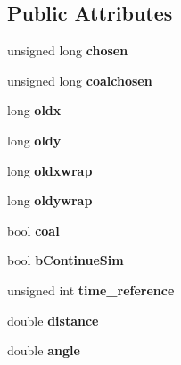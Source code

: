 \subsection*{Public Attributes}
\begin{DoxyCompactItemize}
\item 
unsigned long {\bfseries chosen}\hypertarget{struct_step_a03a0984250a050752ff20129ff457510}{}\label{struct_step_a03a0984250a050752ff20129ff457510}

\item 
unsigned long {\bfseries coalchosen}\hypertarget{struct_step_a5824c6f227fbe3aa249f6067bae0aab2}{}\label{struct_step_a5824c6f227fbe3aa249f6067bae0aab2}

\item 
long {\bfseries oldx}\hypertarget{struct_step_a79f782f87fe4df1f7df10bc6b102530a}{}\label{struct_step_a79f782f87fe4df1f7df10bc6b102530a}

\item 
long {\bfseries oldy}\hypertarget{struct_step_afde730c847c774e13f96c36a2a87a818}{}\label{struct_step_afde730c847c774e13f96c36a2a87a818}

\item 
long {\bfseries oldxwrap}\hypertarget{struct_step_ad627fdb344ea1b6e143bf81794955f9a}{}\label{struct_step_ad627fdb344ea1b6e143bf81794955f9a}

\item 
long {\bfseries oldywrap}\hypertarget{struct_step_ae18da2822c5603f935b02454c1c8f9f3}{}\label{struct_step_ae18da2822c5603f935b02454c1c8f9f3}

\item 
bool {\bfseries coal}\hypertarget{struct_step_a20362fa305c240b197cab6934b4b5087}{}\label{struct_step_a20362fa305c240b197cab6934b4b5087}

\item 
bool {\bfseries b\+Continue\+Sim}\hypertarget{struct_step_a38035eb27c4eb998e5303905356a2cab}{}\label{struct_step_a38035eb27c4eb998e5303905356a2cab}

\item 
unsigned int {\bfseries time\+\_\+reference}\hypertarget{struct_step_a2ad070594a57205ace161c8e910e06b4}{}\label{struct_step_a2ad070594a57205ace161c8e910e06b4}

\item 
double {\bfseries distance}\hypertarget{struct_step_adcded9ae31a77edc5b91457e38008a7a}{}\label{struct_step_adcded9ae31a77edc5b91457e38008a7a}

\item 
double {\bfseries angle}\hypertarget{struct_step_a92772e673d8c49b468df8710e49cffcb}{}\label{struct_step_a92772e673d8c49b468df8710e49cffcb}

\end{DoxyCompactItemize}


